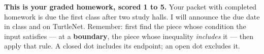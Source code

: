 \documentclass[12pt]{article}
\begin{document}

\vspace{0.10in}

\boxguard[8]
\begin{remindbox}
\small
\textbf{This is your graded homework, scored 1 to 5.} Your packet with completed homework is due the first
class after two study halls. I will announce the due date in class and on TurtleNet. Remember:
first find the piece whose condition the input satisfies --- at a \textbf{boundary}, the piece
whose inequality \emph{includes} it --- then apply that rule. A closed dot includes its endpoint;
an open dot excludes it.
\end{remindbox}

\vspace{0.10in}
\end{document}
